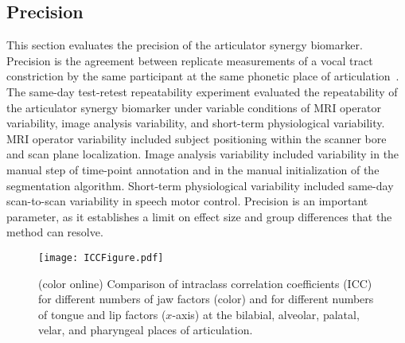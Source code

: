 \documentclass[reprint]{JASAnew}\usepackage[]{graphicx}\usepackage[]{color}
\begin{document}
\subsection{Precision}
\label{subsec:repeatability}

This section evaluates the precision of the articulator synergy biomarker. Precision is the agreement between replicate measurements of a vocal tract constriction by the same participant at the same phonetic place of articulation~\citep{kessler2015emerging,sullivan2015metrology}. 
%
The same-day test-retest repeatability experiment evaluated the repeatability of the articulator synergy biomarker under variable conditions of MRI operator variability, image analysis variability, and short-term physiological variability. 
%
MRI operator variability included subject positioning within the scanner bore and scan plane localization. 
%
Image analysis variability included variability in the manual step of time-point annotation and in the manual initialization of the segmentation algorithm. 
%
Short-term physiological variability included same-day scan-to-scan variability in speech motor control. 
%
Precision is an important parameter, as it establishes a limit on effect size and group differences that the method can resolve.

\begin{figure*}[t]
\raggedright
\texttt{[image: ICCFigure.pdf]}

\caption{(color online) Comparison of intraclass correlation coefficients (ICC) for different numbers of jaw factors (color) and for different numbers of tongue and lip factors ($x$-axis) at the bilabial, alveolar, palatal, velar, and pharyngeal places of articulation.}
\label{fig:icc_all}

\end{figure*}
\end{document}
